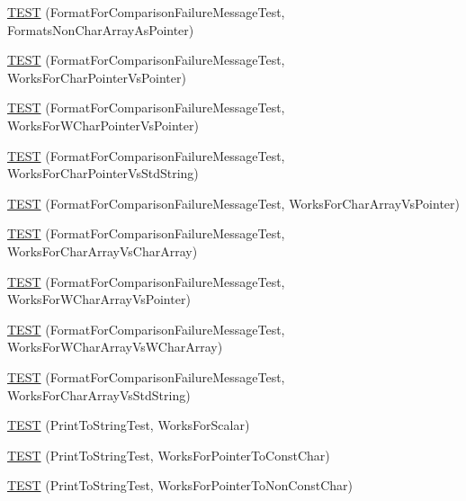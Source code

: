 \begin{DoxyCompactItemize}
\item 
\hyperlink{namespacetesting_1_1gtest__printers__test_a3571808f93f419268b6aed1aa127ea30}{T\+E\+ST} (Format\+For\+Comparison\+Failure\+Message\+Test, Formats\+Non\+Char\+Array\+As\+Pointer)
\item 
\hyperlink{namespacetesting_1_1gtest__printers__test_a1694d4063da702f5379495d3cb2cbc91}{T\+E\+ST} (Format\+For\+Comparison\+Failure\+Message\+Test, Works\+For\+Char\+Pointer\+Vs\+Pointer)
\item 
\hyperlink{namespacetesting_1_1gtest__printers__test_a735171f4ba0a9dffee9c4c7321107822}{T\+E\+ST} (Format\+For\+Comparison\+Failure\+Message\+Test, Works\+For\+W\+Char\+Pointer\+Vs\+Pointer)
\item 
\hyperlink{namespacetesting_1_1gtest__printers__test_ab5a910170489276c14b817b70d4feb96}{T\+E\+ST} (Format\+For\+Comparison\+Failure\+Message\+Test, Works\+For\+Char\+Pointer\+Vs\+Std\+String)
\item 
\hyperlink{namespacetesting_1_1gtest__printers__test_ac25834e0463cf9f3d231db24e7b220e5}{T\+E\+ST} (Format\+For\+Comparison\+Failure\+Message\+Test, Works\+For\+Char\+Array\+Vs\+Pointer)
\item 
\hyperlink{namespacetesting_1_1gtest__printers__test_aba32640344f0186de5fbb6bb47e0c5a5}{T\+E\+ST} (Format\+For\+Comparison\+Failure\+Message\+Test, Works\+For\+Char\+Array\+Vs\+Char\+Array)
\item 
\hyperlink{namespacetesting_1_1gtest__printers__test_a1e95289500400eff5fdcd45c5864a6d2}{T\+E\+ST} (Format\+For\+Comparison\+Failure\+Message\+Test, Works\+For\+W\+Char\+Array\+Vs\+Pointer)
\item 
\hyperlink{namespacetesting_1_1gtest__printers__test_af4b502fb5745d2ee0bfb81d1c8eb95f6}{T\+E\+ST} (Format\+For\+Comparison\+Failure\+Message\+Test, Works\+For\+W\+Char\+Array\+Vs\+W\+Char\+Array)
\item 
\hyperlink{namespacetesting_1_1gtest__printers__test_ac2300073f401f783ff7b1ef97d2cbd6d}{T\+E\+ST} (Format\+For\+Comparison\+Failure\+Message\+Test, Works\+For\+Char\+Array\+Vs\+Std\+String)
\item 
\hyperlink{namespacetesting_1_1gtest__printers__test_a5d1bc4b12c18ccaec2ced9f45c092567}{T\+E\+ST} (Print\+To\+String\+Test, Works\+For\+Scalar)
\item 
\hyperlink{namespacetesting_1_1gtest__printers__test_a68100148758516ebab9c761ca7778586}{T\+E\+ST} (Print\+To\+String\+Test, Works\+For\+Pointer\+To\+Const\+Char)
\item 
\hyperlink{namespacetesting_1_1gtest__printers__test_a1db34d8760c17157572ce2877007d15a}{T\+E\+ST} (Print\+To\+String\+Test, Works\+For\+Pointer\+To\+Non\+Const\+Char)

\end{DoxyCompactItemize}
